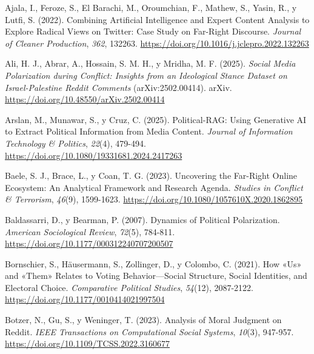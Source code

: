 \documentclass[
  letterpaper,
  numbers=noendperiod,
  fontsize=11pt,
  DIV=12,
  titlepage=false]{scrreprt}
\newlength{\cslhangindent}
\newenvironment{CSLReferences}[2] %
 {\begin{list}{}{%
  \setlength{\itemindent}{0pt}
  \setlength{\leftmargin}{0pt}
  \setlength{\parsep}{0pt}
  \ifodd #1
   \setlength{\leftmargin}{\cslhangindent}
   \setlength{\itemindent}{-1\cslhangindent}
  \fi
  \setlength{\itemsep}{#2\baselineskip}}}
 {\end{list}}
\begin{document}
\label{refs}
\begin{CSLReferences}{1}{0}
Ajala, I., Feroze, S., El Barachi, M., Oroumchian, F., Mathew, S.,
Yasin, R., y Lutfi, S. (2022). Combining Artificial Intelligence and
Expert Content Analysis to Explore Radical Views on Twitter: {Case}
Study on Far-Right Discourse. \emph{Journal of Cleaner Production},
\emph{362}, 132263. \url{https://doi.org/10.1016/j.jclepro.2022.132263}

Ali, H. J., Abrar, A., Hossain, S. M. H., y Mridha, M. F. (2025).
\emph{Social Media Polarization during Conflict: {Insights} from an
Ideological Stance Dataset on {Israel-Palestine Reddit} Comments}
(arXiv:2502.00414). arXiv.
\url{https://doi.org/10.48550/arXiv.2502.00414}

Arslan, M., Munawar, S., y Cruz, C. (2025). Political-{RAG}: Using
Generative {AI} to Extract Political Information from Media Content.
\emph{Journal of Information Technology \& Politics}, \emph{22}(4),
479-494. \url{https://doi.org/10.1080/19331681.2024.2417263}

Baele, S. J., Brace, L., y Coan, T. G. (2023). Uncovering the {Far-Right
Online Ecosystem}: {An Analytical Framework} and {Research Agenda}.
\emph{Studies in Conflict \& Terrorism}, \emph{46}(9), 1599-1623.
\url{https://doi.org/10.1080/1057610X.2020.1862895}

Baldassarri, D., y Bearman, P. (2007). Dynamics of {Political
Polarization}. \emph{American Sociological Review}, \emph{72}(5),
784-811. \url{https://doi.org/10.1177/000312240707200507}

Bornschier, S., Häusermann, S., Zollinger, D., y Colombo, C. (2021). How
{«{Us}»} and {«{Them}»} Relates to Voting Behavior---Social Structure,
Social Identities, and Electoral Choice. \emph{Comparative Political
Studies}, \emph{54}(12), 2087-2122.
\url{https://doi.org/10.1177/0010414021997504}

Botzer, N., Gu, S., y Weninger, T. (2023). Analysis of {Moral Judgment}
on {Reddit}. \emph{IEEE Transactions on Computational Social Systems},
\emph{10}(3), 947-957. \url{https://doi.org/10.1109/TCSS.2022.3160677}


\end{CSLReferences}
\end{document}
